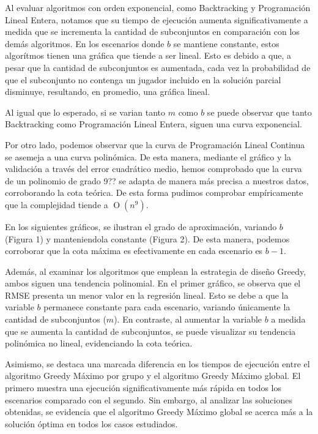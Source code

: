 Al evaluar algoritmos con orden exponencial, como Backtracking y Programación Lineal Entera, notamos que su tiempo de ejecución aumenta significativamente a medida que se incrementa la cantidad de subconjuntos en comparación con los demás algoritmos.
En los escenarios donde $b$ se mantiene constante, estos algorítmos tienen una gráfica que tiende a ser lineal. Esto es debido a que, a pesar que la cantidad de subconjuntos es aumentada, cada vez la probabilidad de que el subconjunto no contenga un jugador incluido en la solución parcial disminuye, resultando, en promedio, una gráfica lineal. 

Al igual que lo esperado, si se varian tanto $m$ como $b$ se puede observar que tanto Backtracking  como Programación Lineal Entera, siguen una curva exponencial. 

Por otro lado, podemos observar que la curva de Programación Lineal Continua se asemeja a una curva polinómica. De esta manera, mediante el gráfico y la validación a través del error cuadrático medio, hemos comprobado que la curva de un polinomio de grado 9?? se adapta de manera más precisa a nuestros datos, corroborando la cota teórica. De esta forma pudimos comprobar empíricamente que la complejidad tiende a $\operatorname{O}(n^{9})$. 

En los siguientes gráficos, se ilustran el grado de aproximación, variando $b$ (Figura 1) y manteniendola constante (Figura 2). De esta manera, podemos corroborar que la cota máxima es efectivamente en cada escenario es $b-1$.


Además, al examinar los algoritmos que emplean la estrategia de diseño Greedy, ambos siguen una tendencia polinomial. En el primer gráfico, se observa que el RMSE presenta un menor valor en la regresión lineal. Esto se debe a que la variable $b$ permanece constante para cada escenario, variando únicamente la cantidad de subconjuntos ($m$). En contraste, al aumentar la variable $b$ a medida que se aumenta la cantidad de subconjuntos, se puede visualizar su tendencia polinómica no lineal, evidenciando la cota teórica. 

Asimismo, se destaca una marcada diferencia en los tiempos de ejecución entre el algoritmo Greedy Máximo por grupo y el algoritmo Greedy Máximo global. El primero muestra una ejecución significativamente más rápida en todos los escenarios comparado con el segundo. Sin embargo, al analizar las soluciones obtenidas, se evidencia que el algoritmo Greedy Máximo global se acerca más a la solución óptima en todos los casos estudiados.


